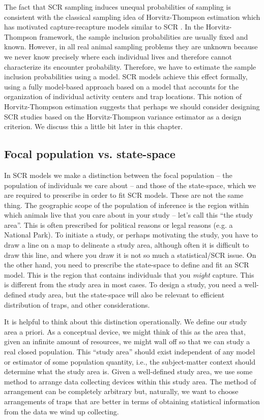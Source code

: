 The fact that SCR sampling induces unequal probabilities of sampling
is consistent with the classical sampling idea of Horvitz-Thompson
estimation which has motivated capture-recapture models similar to SCR
\citep{huggins:1989, alho:1990}.  In the Horvitz-Thompson framework,
the sample inclusion probabilities are usually fixed and
known. However, in all real animal sampling problems they are unknown
because we never know precisely where each individual lives and
therefore cannot characterize its encounter probability.  Therefore,
we have to estimate the sample inclusion probabilities using a model.
SCR models achieve this effect formally, using a fully model-based
approach based on a model that accounts for the organization of
individual activity centers and trap locations.  This notion of
Horvitz-Thompson estimation suggests that perhaps we should consider
designing SCR studies based on the Horvitz-Thompson variance estimator
as a design criterion. We discuss this a little bit later in this
chapter.

\subsection{Focal population vs. state-space}

In SCR models we make a distinction between the focal population --
the population of individuals we care about -- and those
of the state-space,
which we are required to prescribe in order to fit SCR models.
These are not the same thing. The geographic scope of the population
of inference is the
region within which animals live that you care about in your study --
let's call this ``the study area''.  This is often prescribed for
political reasons or legal reasons (e.g. a National Park). To initiate a study, or perhaps
motivating the study, you have to draw a line on a map to delineate a
study area, although often it is difficult to draw this line, and
where you draw it is not so much a statistical/SCR issue.  On the
other hand, you need to prescribe the state-space to define and fit an
SCR model. This is the region that contains individuals that you {\it
  might} capture. This is different from the study area in most cases.
To design a study, you need a well-defined study area, but the
state-space will also be relevant to efficient distribution of traps,
and other considerations.

It is helpful to think about this distinction operationally. We define
our study area a priori.  As a conceptual device, we might think of
this as the area that, given an infinite amount of resources, we might
wall off so that we can study a real closed population. This ``study
area'' should exist independent of any model or estimator of some
population quantity, i.e., the subject-matter context should determine
what the study area is. Given a well-defined study area, we use some
method to arrange data collecting devices within this study area. The
method of arrangement can be completely arbitrary but, naturally, we
want to choose arrangements of traps that are better in terms of
obtaining statistical information from the data we wind up collecting.

